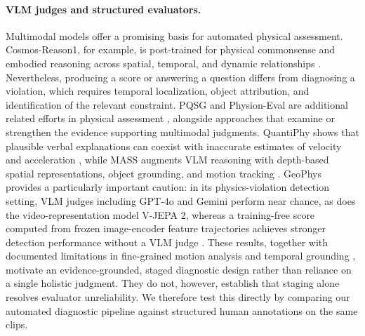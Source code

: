 \documentclass{article} %
\begin{document}
\paragraph{VLM judges and structured evaluators.}
Multimodal models offer a promising basis for automated physical assessment. Cosmos-Reason1, for example, is post-trained for physical commonsense and embodied reasoning across spatial, temporal, and dynamic relationships \citep{nvidia2025cosmosreason}. Nevertheless, producing a score or answering a question differs from diagnosing a violation, which requires temporal localization, object attribution, and identification of the relevant constraint. PQSG and Physion-Eval are additional related efforts in physical assessment \citep{pothiraj2026physicsquestionscenegraph, zhang2026physionevalevaluatingphysicalrealism}, alongside approaches that examine or strengthen the evidence supporting multimodal judgments. QuantiPhy shows that plausible verbal explanations can coexist with inaccurate estimates of velocity and acceleration \citep{puyin2026quantiphy}, while MASS augments VLM reasoning with depth-based spatial representations, object grounding, and motion tracking \citep{wu2026mass}. GeoPhys provides a particularly important caution: in its physics-violation detection setting, VLM judges including GPT-4o and Gemini perform near chance, as does the video-representation model V-JEPA 2, whereas a training-free score computed from frozen image-encoder feature trajectories achieves stronger detection performance without a VLM judge \citep{internò2026geophysgeometryphysicalplausibility}. These results, together with documented limitations in fine-grained motion analysis and temporal grounding \citep{hong2025motionbench,wang2025grounded}, motivate an evidence-grounded, staged diagnostic design rather than reliance on a single holistic judgment. They do not, however, establish that staging alone resolves evaluator unreliability. We therefore test this directly by comparing our automated diagnostic pipeline against structured human annotations on the same clips.
\end{document}
